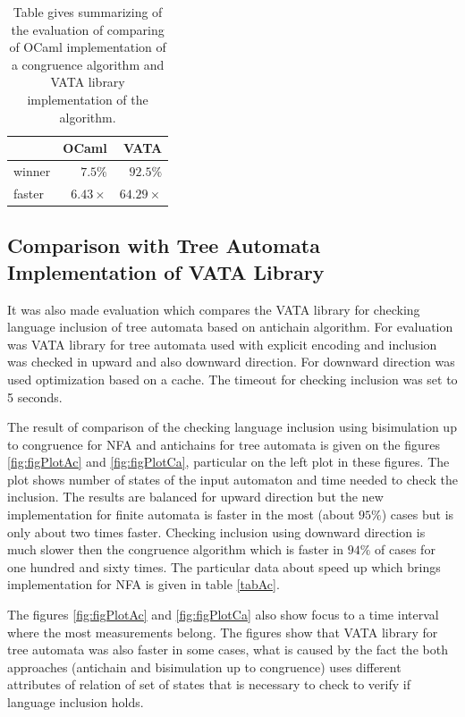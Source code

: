 \begin{center}
\begin{table}[tb]
\begin{center}
  \begin{tabular}{ | l | r | r |}
   \hline
    & \textbf{OCaml} & \textbf{VATA} \\ \hline \hline
    winner & $7.5\%$ & $92.5\%$ \\ \hline
    faster & $6.43\times$ & $64.29\times$ \\ \hline
   \end{tabular}
   \caption{Table gives summarizing of the evaluation of comparing of OCaml implementation of a congruence algorithm and VATA library implementation 
     of the algorithm.}
   \label{tabOcaml}
\end{center}
\end{table}
\end{center}

\subsection{Comparison with Tree Automata Implementation of VATA Library}
It was also made evaluation which compares the VATA library for checking language inclusion of tree automata based on antichain algorithm. For evaluation was 
VATA library for tree automata used with explicit encoding and inclusion was checked in upward and also downward direction. For downward direction was used
optimization based on a cache. The timeout for checking inclusion was set to 5 seconds.

The result of comparison of the checking language inclusion using bisimulation up to congruence for NFA and antichains for tree automata 
is given on the figures \ref{fig:figPlotAc} and \ref{fig:figPlotCa}, particular on the left plot in these figures. The plot shows number of states of the input
automaton and time needed to check the inclusion. The results are balanced for upward direction but the new implementation for finite automata is faster in the
most (about $95\%$) cases but is only about two times faster. Checking inclusion using downward direction is much slower then 
the congruence algorithm which is faster in $94\%$ of cases for one hundred and sixty times. The particular data about speed up 
which brings implementation for NFA is given in table \ref{tabAc}.

The figures \ref{fig:figPlotAc} and \ref{fig:figPlotCa} also show
focus to a time interval where the most measurements belong. The figures show that VATA library for tree automata was
also faster in some cases, what is caused by the fact the both approaches (antichain and bisimulation up to congruence) uses different attributes of relation
of set of states that is necessary to check to verify if language inclusion holds.

